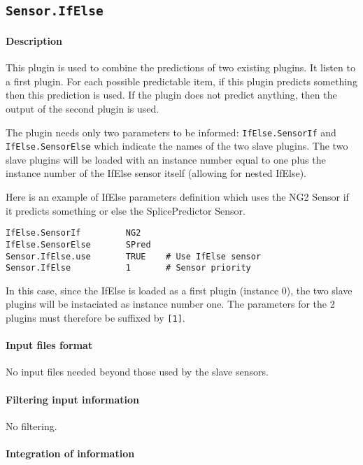 
\subsection{\texttt{Sensor.IfElse}}

\paragraph{Description}

This plugin is used to combine the predictions of two existing
plugins. It listen to a first plugin. For each possible predictable
item, if this plugin predicts something then this prediction is used.
If the plugin does not predict anything, then the output of the second
plugin is used.
 
The plugin needs only two parameters to be informed:
\texttt{IfElse.SensorIf} and \texttt{IfElse.SensorElse} which indicate
the names of the two slave plugins. The two slave plugins will be
loaded with an instance number equal to one plus the instance number
of the IfElse sensor itself (allowing for nested IfElse).

Here is an example of IfElse parameters definition which uses the NG2
Sensor if it predicts something or else the SplicePredictor Sensor.
\begin{Verbatim}[fontsize=\small]
IfElse.SensorIf         NG2
IfElse.SensorElse       SPred
Sensor.IfElse.use       TRUE    # Use IfElse sensor
Sensor.IfElse           1       # Sensor priority
\end{Verbatim}

In this case, since the IfElse is loaded as a first plugin (instance
0), the two slave plugins will be instaciated as instance number
one. The parameters for the 2 plugins must therefore be suffixed by
\texttt{[1]}.

\paragraph{Input files format}

No input files  needed beyond those used by the slave sensors.

\paragraph{Filtering input information}

No filtering.

\paragraph{Integration of information}

